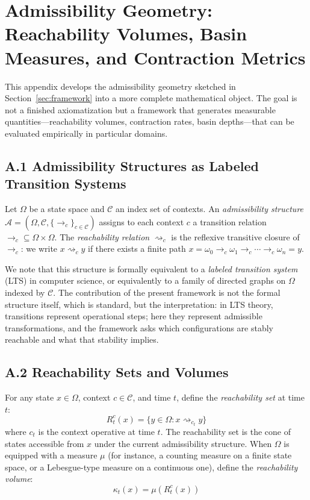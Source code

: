 \documentclass[12pt, a4paper]{article}
\theoremstyle{plain}
\theoremstyle{definition}
\theoremstyle{remark}
\begin{document}
\newpage
\appendix

\section{Admissibility Geometry: Reachability Volumes, Basin Measures, and Contraction Metrics}
\label{app:admissibility}

This appendix develops the admissibility geometry sketched in
Section~\ref{sec:framework} into a more complete mathematical object. The
goal is not a finished axiomatization but a framework that generates
measurable quantities---reachability volumes, contraction rates, basin
depths---that can be evaluated empirically in particular domains.

\subsection*{A.1 Admissibility Structures as Labeled Transition Systems}

Let $\Omega$ be a state space and $\mathcal{C}$ an index set of contexts.
An \emph{admissibility structure} $\mathcal{A} = (\Omega, \mathcal{C},
\{\to_c\}_{c \in \mathcal{C}})$ assigns to each context $c$ a transition
relation $\to_c \subseteq \Omega \times \Omega$. The \emph{reachability
relation} $\rightsquigarrow_c$ is the reflexive transitive closure of
$\to_c$: we write $x \rightsquigarrow_c y$ if there exists a finite path
$x = \omega_0 \to_c \omega_1 \to_c \cdots \to_c \omega_n = y$.

We note that this structure is formally equivalent to a \emph{labeled
transition system} (LTS) in computer science, or equivalently to a family
of directed graphs on $\Omega$ indexed by $\mathcal{C}$. The contribution
of the present framework is not the formal structure itself, which is
standard, but the interpretation: in LTS theory, transitions represent
operational steps; here they represent admissible transformations, and the
framework asks which configurations are stably reachable and what that
stability implies.

\subsection*{A.2 Reachability Sets and Volumes}

For any state $x \in \Omega$, context $c \in \mathcal{C}$, and time $t$,
define the \emph{reachability set} at time $t$:
$$R_t^c(x) = \{y \in \Omega : x \rightsquigarrow_{c_t} y\}$$
where $c_t$ is the context operative at time $t$. The reachability set
is the cone of states accessible from $x$ under the current admissibility
structure. When $\Omega$ is equipped with a measure $\mu$ (for instance,
a counting measure on a finite state space, or a Lebesgue-type measure
on a continuous one), define the \emph{reachability volume}:
$$\kappa_t(x) = \mu(R_t^c(x))$$
\end{document}
